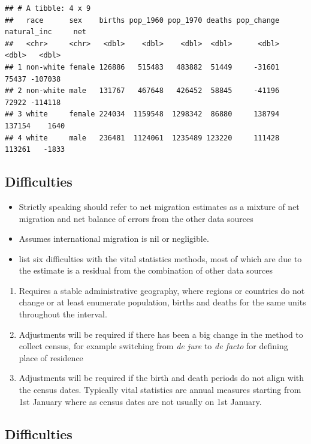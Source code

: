 \documentclass[
]{book}
\providecommand{\tightlist}{%
  \setlength{\itemsep}{0pt}\setlength{\parskip}{0pt}}
\begin{document}
\begin{verbatim}
## # A tibble: 4 x 9
##   race      sex    births pop_1960 pop_1970 deaths pop_change natural_inc     net
##   <chr>     <chr>   <dbl>    <dbl>    <dbl>  <dbl>      <dbl>       <dbl>   <dbl>
## 1 non-white female 126886   515483   483882  51449     -31601       75437 -107038
## 2 non-white male   131767   467648   426452  58845     -41196       72922 -114118
## 3 white     female 224034  1159548  1298342  86880     138794      137154    1640
## 4 white     male   236481  1124061  1235489 123220     111428      113261   -1833
\end{verbatim}

\hypertarget{difficulties}{%
\subsection{Difficulties}\label{difficulties}}

\begin{itemize}
\tightlist
\item
  Strictly speaking should refer to net migration estimates as a mixture of net migration and net balance of errors from the other data sources
\item
  Assumes international migration is nil or negligible.
\item
  \citet{Bogue1982} list six difficulties with the vital statistics methods, most of which are due to the estimate is a residual from the combination of other data sources
\end{itemize}

\begin{enumerate}
\def\labelenumi{\arabic{enumi}.}
\item
  Requires a stable administrative geography, where regions or countries do not change or at least enumerate population, births and deaths for the same units throughout the interval.
\item
  Adjustments will be required if there has been a big change in the method to collect census, for example switching from \emph{de jure} to \emph{de facto} for defining place of residence
\item
  Adjustments will be required if the birth and death periods do not align with the census dates. Typically vital statistics are annual measures starting from 1st January where as census dates are not usually on 1st January.
\end{enumerate}

\hypertarget{difficulties-1}{%
\subsection{Difficulties}\label{difficulties-1}}
\end{document}
